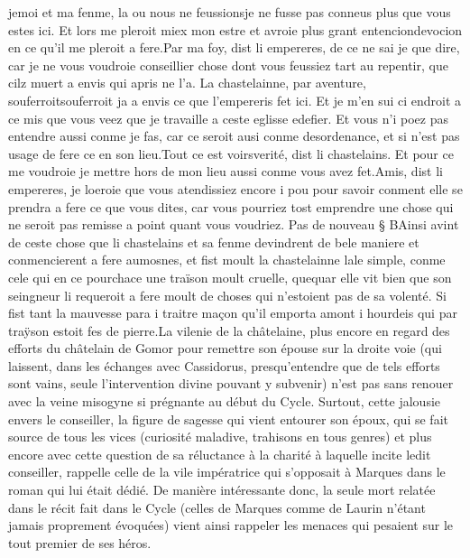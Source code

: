 \documentclass{article}
\begin{document}
\begin{pages}
         jemoi et 
         ma fenme, 
      la ou 
      nous ne feussionsje ne fusse pas conneus plus que vous estes ici. 
      Et lors me pleroit miex mon estre  et avroie plus grant 
      entenciondevocion en ce qu’il me pleroit a fere.Par ma foy, dist li empereres, de ce ne sai je que dire, 
   car je ne vous voudroie conseillier chose dont vous feussiez tart au repentir, que 
   cilz muert a envis qui apris ne l’a. La chastelainne, 
      par aventure, souferroitsouferroit ja a envis ce que 
      l’empereris fet ici. 
      Et je m’en sui ci endroit a ce mis que vous veez que je travaille a ceste eglisse 
      edefier. Et vous n’i poez pas entendre aussi conme je fas, car ce seroit ausi conme desordenance, 
      et si n’est pas usage de fere ce en son lieu.Tout ce est voirsverité, dist 
      li chastelains. Et pour ce me voudroie je mettre hors de mon lieu aussi conme vous avez fet.Amis, dist li empereres, 
   je loeroie que vous atendissiez encore i pou pour savoir conment elle se prendra a fere ce que vous dites, 
   car vous pourriez tost emprendre une chose qui ne seroit pas remisse a point quant vous voudriez. \pend
\pstart Pas de nouveau § BAinsi avint de ceste chose que 
   li chastelains et sa fenme devindrent de bele maniere et 
   conmencierent a fere aumosnes, et fist moult la chastelainne 
   lale simple, conme cele qui en ce pourchace une traïson moult cruelle, 
   quequar elle vit bien que son seingneur 
   li requeroit a fere moult de choses qui n’estoient pas de sa volenté. Si fist tant 
   la mauvesse para 
   i traitre maçon qu’il emporta amont i hourdeis qui par traÿson estoit fes de pierre.La
      vilenie de la châtelaine, plus encore en regard des efforts du châtelain de Gomor pour remettre son épouse sur la droite voie (qui laissent, 
      dans les échanges avec Cassidorus, presqu'entendre que de tels efforts sont vains, seule l'intervention divine pouvant y subvenir) n'est pas sans renouer avec la veine misogyne si prégnante au début du Cycle. 
      Surtout, cette jalousie envers le conseiller, la figure de sagesse qui vient entourer son époux, qui se fait source de tous les vices 
      (curiosité maladive, trahisons en tous genres) et plus encore avec cette question de sa réluctance à la charité à laquelle incite ledit 
      conseiller, rappelle celle de la vile impératrice qui s'opposait à Marques dans le roman qui lui était dédié. De manière intéressante donc, 
      la seule mort relatée dans le récit fait dans le Cycle (celles de Marques comme de Laurin n'étant jamais proprement évoquées) vient ainsi 
      rappeler les menaces qui pesaient sur le tout premier de ses héros. 

\end{pages}
\end{document}

